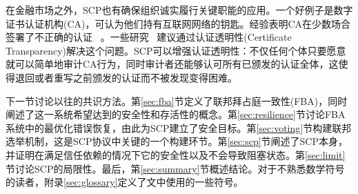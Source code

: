 在金融市场之外，SCP也有确保组织诚实履行关键职能的应用。一个好例子是数字证书认证机构(CA)，可认为他们持有互联网网络的钥匙。经验表明CA在少数场合签署了不正确的认证~\cite{ac_ms2013,dc_google2015} 。一些研究~\cite{Kim:2013up,ct_google2013,Basin:2014bn,cryptoeprint:2014:1004} 建议通过认证透明性(Certificate Transparency)解决这个问题。SCP可以增强认证透明性：不仅任何个体只要愿意就可以简单地审计CA行为，同时审计者还能够认可所有已颁发的认证全体，这使得退回或者重写之前颁发的认证而不被发现变得困难。

下一节讨论以往的共识方法。第\ref{sec:fba}节定义了联邦拜占庭一致性(FBA)，同时阐述了这一系统希望达到的安全性和存活性的概念。第\ref{sec:resilience}节讨论FBA系统中的最优化错误恢复，由此为SCP建立了安全目标。第\ref{sec:voting}节构建联邦选举机制，这是SCP协议中关键的一个构建环节。第\ref{sec:scp}节阐述了SCP本身，并证明在满足信任依赖的情况下它的安全性以及不会导致阻塞状态。第\ref{sec:limit}节讨论SCP的局限性。最后，第\ref{sec:summary}节概述结论。对于不熟悉数学符号的读者，附录\ref{sec:glossary}定义了文中使用的一些符号。